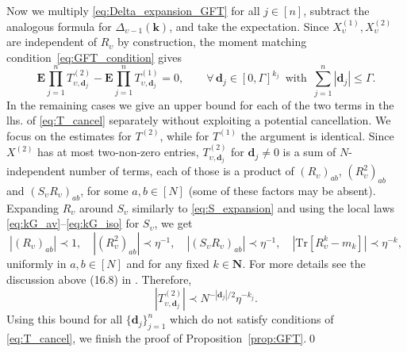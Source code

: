 \documentclass[10pt]{amsart}
\numberwithin{equation}{section}
\newcommand{\E}{\mathbf{E}}
\newcommand{\N}{\mathbf{N}}
\newcommand{\Tr}{\mathrm{Tr}}
\begin{document}
Now we multiply \eqref{eq:Delta_expansion_GFT} for all $j\in [n]$, subtract the analogous formula for $\Delta_{\upsilon-1}(\bm{k})$, and take the expectation. Since $X^{(1)}_\upsilon, X^{(2)}_\upsilon$ are independent of $R_\upsilon$ by construction, the moment matching condition~\eqref{eq:GFT_condition} gives
\begin{equation}
\E \prod_{j=1}^n T_{\upsilon, \bm{d}_j}^{(2)} - \E \prod_{j=1}^n T_{\upsilon, \bm{d}_j}^{(1)} = 0,\qquad\forall\,\bm{d}_j\in [0,\Gamma]^{k_j}\,\,\,\text{with}\,\,\, \sum_{j=1}^n |\bm{d}_j|\le \Gamma. 
\label{eq:T_cancel}
\end{equation}
In the remaining cases we give an upper bound for each of the two terms in the lhs. of \eqref{eq:T_cancel} separately without exploiting a potential cancellation. We focus on the estimates for $T^{(2)}$, while for $T^{(1)}$ the argument is identical. Since $X^{(2)}$ has at most two-non-zero entries, $T_{\upsilon, \bm{d}_j}^{(2)}$ for $\bm{d}_j\neq 0$ is a sum of $N$-independent number of terms, each of those is a product of $(R_\upsilon)_{ab}$, $(R_\upsilon^2)_{ab}$ and $(S_\upsilon R_\upsilon)_{ab}$, for some $a,b\in [N]$ (some of these factors may be absent). Expanding $R_\upsilon$ around $S_\upsilon$ similarly to \eqref{eq:S_expansion} and using the local laws \eqref{eq:kG_av}--\eqref{eq:kG_iso} for $S_\upsilon$, we get
\begin{equation}
\left\vert (R_\upsilon)_{ab}\right\vert\prec 1,\quad \left\vert (R_\upsilon^2)_{ab}\right\vert\prec \eta^{-1},\quad \left\vert (S_\upsilon R_\upsilon)_{ab}\right\vert\prec \eta^{-1},\quad \left\vert \Tr\left[ R_\upsilon^{k}-m_k\right]\right\vert \prec \eta^{-k},
\end{equation}
uniformly in $a,b\in [N]$ and for any fixed $k\in\N$. For more details see the discussion above (16.8) in \cite{erdHos2017dynamical}. Therefore,
\begin{equation}
\left\vert T_{\upsilon, \bm{d}_j}^{(2)}\right\vert \prec N^{-|\bm{d}_j|/2} \eta^{-k_j}.
\end{equation}
Using this bound for all $\{\bm{d}_j\}_{j=1}^n$ which do not satisfy conditions of \eqref{eq:T_cancel}, we finish the proof of Proposition~\ref{prop:GFT}.\hfill\qed
\end{document}
